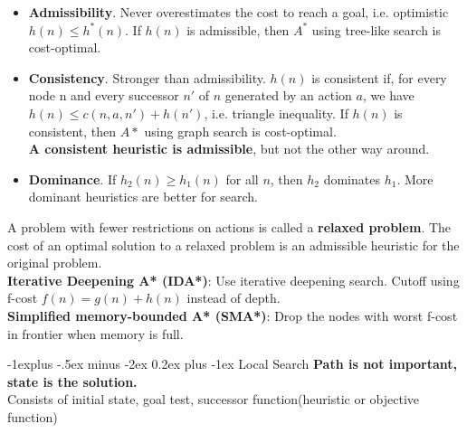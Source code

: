 \documentclass[10pt,landscape]{article}
\makeatletter
\renewcommand{\subsection}{\@startsection{subsection}{2}{0mm}%
                                {-1explus -.5ex minus -2ex}%
                                {0.2ex plus -1ex}%
                                {\normalfont\small\bfseries}}
\makeatother
\begin{document}
\begin{multicols}{3}
\begin{scriptsize}
 \begin{itemize}
  \item \textbf{Admissibility}. Never overestimates the cost to reach a
  goal, i.e. optimistic $h(n) \leq h^*(n)$. If $h(n)$ is admissible, then $A^*$ using
  tree-like search is cost-optimal.
  \item \textbf{Consistency}. Stronger than admissibility. $h(n)$ is consistent if, for every node n and every successor $n'$ of $n$
  generated by an action $a$, we have $h(n) \leq c(n,a,n') +
  h(n')$, i.e. triangle inequality. If $h(n)$ is consistent, then
  $A*$ using graph search is cost-optimal.\\\textbf{A consistent heuristic is admissible}, but not the other way around.
  \item \textbf{Dominance}. If $h_2(n) \geq h_1(n)$ for all $n$, then $h_2$ dominates $h_1$. 
  More dominant heuristics are better for search.
\end{itemize}

A problem with fewer restrictions on actions is called a \textbf{relaxed problem}.
The cost of an optimal solution to a relaxed problem is an admissible heuristic for the original problem.\\

\textbf{Iterative Deepening A* (IDA*)}: Use iterative deepening search. Cutoff using f-cost $f(n) = g(n) + h(n)$ instead of depth.\\
\textbf{Simplified memory-bounded A* (SMA*)}: Drop the nodes with worst f-cost in frontier when memory is full.

\subsection{Local Search}
\textbf{Path is not important, state is the solution.}\\
Consists of initial state, goal test, successor function(heuristic or objective function)


\end{scriptsize}
\end{multicols}
\end{document}
